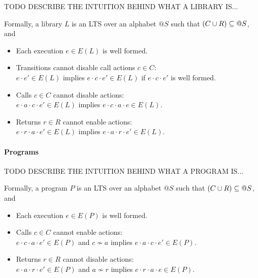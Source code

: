 TODO DESCRIBE THE INTUITION BEHIND WHAT A LIBRARY IS...

Formally, a library $L$ is an LTS over an alphabet $@S$ such that $(C \cup R)
\subseteq @S$, and
\begin{itemize}

  \item Each execution $e \in E(L)$ is well formed.

  \item Transitions cannot disable call actions $c \in C$: \\
  $e \cdot e' \in E(L)$ implies $e \cdot c \cdot e' \in E(L)$
  if $e \cdot c \cdot e'$ is well formed.
  
  \item Calls $c \in C$ cannot disable actions: \\
  $e \cdot a \cdot c \cdot e' \in E(L)$ implies $e \cdot c \cdot a \cdot e \in E(L)$.
  
  \item Returns $r \in R$ cannot enable actions: \\
  $e \cdot r \cdot a \cdot e' \in E(L)$ implies $e \cdot a \cdot r \cdot e' \in E(L)$.

\end{itemize}

\paragraph{Programs}

TODO DESCRIBE THE INTUITION BEHIND WHAT A PROGRAM IS...

Formally, a program $P$ is an LTS over an alphabet $@S$ such that $(C \cup R)
\subseteq @S$, and
\begin{itemize}
  
  \item Each execution $e \in E(P)$ is well formed.
  
	\item Calls $c \in C$ cannot enable actions: \\
  $e \cdot c \cdot a \cdot e' \in E(P)$ and $c \not\sim a$
  implies $e \cdot a \cdot c \cdot e' \in E(P)$.
  
  \item Returns $r \in R$ cannot disable actions: \\
  $e \cdot a \cdot r \cdot e' \in E(P)$ and $a \not\sim r$
  implies $e \cdot r \cdot a \cdot e \in E(P)$.

\end{itemize}

